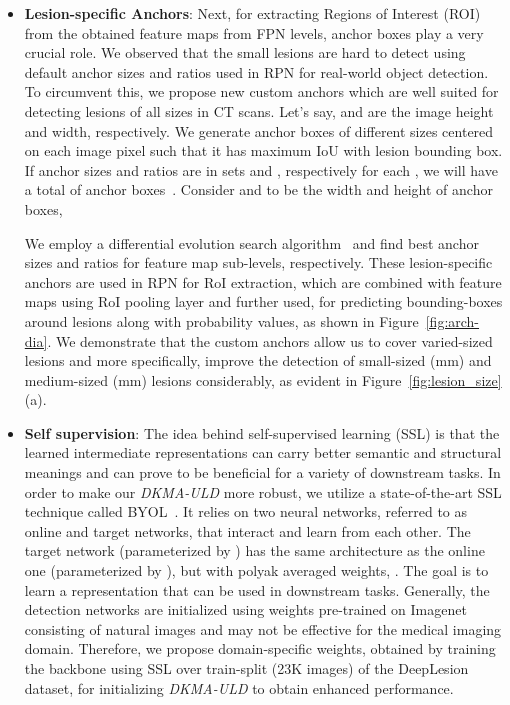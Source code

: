 \documentclass{bmvc2k}
\begin{document}
\begin{itemize}
 
\item \textbf{Lesion-specific Anchors}: Next, for extracting Regions of Interest (ROI) from the obtained feature maps from  FPN levels, anchor boxes play a very crucial role. We observed that the small lesions are hard to detect using default anchor sizes and ratios \cite{he2017mask, lin2017featurefpn} used in RPN for real-world object detection. To circumvent this, we propose new custom anchors which are well suited for detecting lesions of all sizes in CT scans. Let's say,  and  are the image height and width, respectively. We generate anchor boxes of different sizes centered on each image pixel such that it has maximum IoU with lesion bounding box. If anchor sizes and ratios are in sets  and , respectively for each , we will have a total of  anchor boxes~\cite{zhang2020dive}. Consider  and  to be the width and height of anchor boxes,
\vspace{-2mm}


We employ a differential evolution search algorithm~\cite{storn1997differential} and find  best anchor sizes  and ratios  for  feature map sub-levels, respectively. These lesion-specific anchors are used in RPN for RoI extraction, which are combined with feature maps using RoI pooling layer and further used, for predicting bounding-boxes around lesions along with probability values, as shown in Figure~\ref{fig:arch-dia}. We demonstrate that the custom anchors allow us to cover varied-sized lesions and more specifically, improve the detection of small-sized (mm) and medium-sized (mm) lesions considerably, as evident in Figure~\ref{fig:lesion_size}(a). 

\item \textbf{Self supervision}: The idea behind self-supervised learning (SSL) is that the learned intermediate representations can carry better semantic and structural meanings and can prove to be beneficial for a variety of downstream tasks. In order to make our \emph{DKMA-ULD} more robust, we utilize a state-of-the-art SSL technique called BYOL~\cite{grill2020bootstrap}. It relies on two neural networks, referred to as online and target networks, that interact and learn from each other. The target network (parameterized by ) has the same architecture as the online one (parameterized by ), but with polyak averaged weights, . The goal is to learn a representation  that can be used in downstream tasks. Generally, the detection networks are initialized using weights pre-trained on Imagenet consisting of natural images and may not be effective for the medical imaging domain. Therefore, we propose domain-specific weights, obtained by training the backbone using SSL over train-split (23K images) of the DeepLesion dataset, for initializing \emph{DKMA-ULD} to obtain enhanced performance.



\end{itemize}
\end{document}
